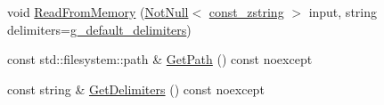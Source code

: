 \begin{DoxyCompactItemize}
void \mbox{\hyperlink{classmage_1_1rendering_1_1loader_1_1_o_b_j_reader_a5aa9068792817b6d6dc840a44b788159}{Read\+From\+Memory}} (\mbox{\hyperlink{namespacemage_a8769f9d670d6b585ea306cb1062af94b}{Not\+Null}}$<$ \mbox{\hyperlink{namespacemage_abfd9206dc607ceb5d13ec68bf075a5c0}{const\+\_\+zstring}} $>$ input, string delimiters=\mbox{\hyperlink{namespacemage_aa161198415efd9349da6187663250aea}{g\+\_\+default\+\_\+delimiters}})
\item 
const std\+::filesystem\+::path \& \mbox{\hyperlink{classmage_1_1rendering_1_1loader_1_1_o_b_j_reader_a9740b3cecdcf5a27c696a08eef3b09da}{Get\+Path}} () const noexcept
\item 
const string \& \mbox{\hyperlink{classmage_1_1rendering_1_1loader_1_1_o_b_j_reader_aa00e1e27b614e11ec9f70e52d0bac551}{Get\+Delimiters}} () const noexcept
\end{DoxyCompactItemize}
